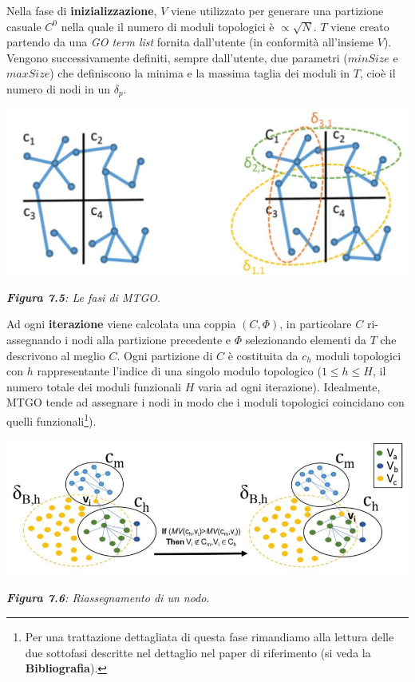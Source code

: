 \documentclass[11pt]{article}
\begin{document}
Nella fase di \textbf{inizializzazione}, $V$ viene utilizzato per generare una partizione casuale $C^0$ nella quale il numero di moduli topologici è $\propto \sqrt{N}$. $T$ viene creato partendo da una \textit{GO term list} fornita dall'utente (in conformità all'insieme $V$). Vengono successivamente definiti, sempre dall'utente, due parametri ($minSize$ e $maxSize$) che definiscono la minima e la massima taglia dei moduli in $T$, cioè il numero di nodi in un $\delta_p$.

\begin{center}
\includegraphics[scale=0.38]{deltax}

\begin{small}\textit{\textbf{Figura 7.5}: Le fasi di MTGO}.\end{small}
\end{center}

Ad ogni \textbf{iterazione} viene calcolata una coppia $(C, \Phi)$, in particolare $C$ ri-assegnando i nodi alla partizione precedente e $\Phi$ selezionando elementi da $T$ che descrivono al meglio $C$. Ogni partizione di $C$ è costituita da $c_h$ moduli topologici con $h$ rappresentante l'indice di una singolo modulo topologico ($1\leq h \leq H$, il numero totale dei moduli funzionali $H$ varia ad ogni iterazione). Idealmente, MTGO tende ad assegnare i nodi in modo che i moduli topologici coincidano con quelli funzionali\footnote{Per una trattazione dettagliata di questa fase rimandiamo alla lettura delle due sottofasi descritte nel dettaglio nel paper di riferimento (si veda la \textbf{Bibliografia}).}).

\begin{center}
\includegraphics[scale=0.62]{deltaa}

\begin{small}\textit{\textbf{Figura 7.6}: Riassegnamento di un nodo}.\end{small}
\end{center}
\end{document}
